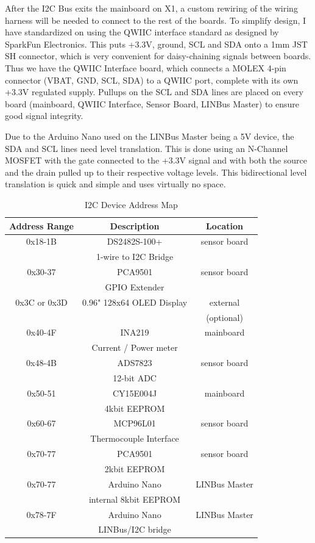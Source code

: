 \documentclass[lettersize,journal]{IEEEtran}
\begin{document}
After the I2C Bus exits the mainboard on X1, a custom rewiring of the wiring harness will be needed to connect to the rest of the boards.  To simplify design, I have standardized on using the QWIIC interface standard as designed by SparkFun Electronics.  This puts +3.3V, ground, SCL and SDA onto a 1mm JST SH connector, which is very convenient for daisy-chaining signals between boards.  Thus we have the QWIIC Interface board, which connects a MOLEX 4-pin connector (VBAT, GND, SCL, SDA) to a QWIIC port, complete with its own +3.3V regulated supply.  Pullups on the SCL and SDA lines are placed on every board (mainboard, QWIIC Interface, Sensor Board, LINBus Master) to ensure good signal integrity.

Due to the Arduino Nano used on the LINBus Master being a 5V device, the SDA and SCL lines need level translation.  This is done using an N-Channel MOSFET with the gate connected to the +3.3V signal and with both the source and the drain pulled up to their respective voltage levels.  This bidirectional level translation is quick and simple and uses virtually no space.

\begin{table}
\begin{center}
\caption{I2C Device Address Map}
\label{i2c-addresses}
\begin{tabular}{| c | c | c |}
\hline
Address Range & Description & Location \\
\hline
0x18-1B & DS2482S-100+ & sensor board \\
& 1-wire to I2C Bridge & \\
\hline
0x30-37 & PCA9501 & sensor board \\
& GPIO Extender & \\
\hline
0x3C or 0x3D & 0.96" 128x64 OLED Display & external \\
& & (optional) \\
\hline
0x40-4F & INA219 & mainboard \\
& Current / Power meter & \\
\hline
0x48-4B & ADS7823 & sensor board \\
& 12-bit ADC & \\
\hline
0x50-51 & CY15E004J & mainboard \\
& 4kbit EEPROM & \\
\hline
0x60-67 & MCP96L01 & sensor board \\
& Thermocouple Interface & \\
\hline
0x70-77 & PCA9501 & sensor board \\
& 2kbit EEPROM & \\
\hline
0x70-77 & Arduino Nano & LINBus Master \\
& internal 8kbit EEPROM & \\
\hline
0x78-7F & Arduino Nano & LINBus Master \\
& LINBus/I2C bridge & \\
\hline
\end{tabular}
\end{center}
\end{table}
\end{document}
